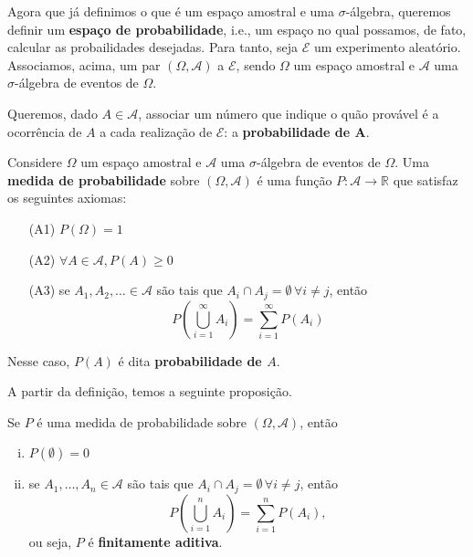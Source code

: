 \documentclass[../Notas.tex]{subfiles}
\begin{document}
Agora que já definimos o que é um espaço amostral e uma $\sigma$-álgebra, queremos definir um {\bf espaço de probabilidade}, i.e., um espaço no qual possamos, de fato, calcular as probailidades desejadas. Para tanto, seja $\mathcal{E}$ um experimento aleatório. Associamos, acima, um par $(\Omega, \mathcal{A})$ a $\mathcal{E}$, sendo $\Omega$ um espaço amostral e $\mathcal{A}$ uma $\sigma$-álgebra de eventos de $\Omega$.

Queremos, dado $A\in\mathcal{A}$, associar um número que indique o quão provável é a ocorrência de $A$ a cada realização de $\mathcal{E}$: a {\bf probabilidade de A}.

\begin{definition}
Considere $\Omega$ um espaço amostral e $\mathcal{A}$ uma $\sigma$-álgebra de eventos de $\Omega$. Uma {\bf medida de probabilidade} sobre $(\Omega, \mathcal{A})$ é uma função $P:\mathcal{A}\to\mathbb{R}$ que satisfaz os seguintes axiomas:
\begin{itemize}
    \item[(A1)] $P(\Omega) = 1$
    \item[(A2)] $\forall A\in\mathcal{A}, P(A)\geq 0$
    \item[(A3)] se $A_1, A_2, \dots \in\mathcal{A}$ são tais que $A_i\cap A_j = \emptyset \, \forall i\neq j$, então
    \begin{equation}
    \tag{$\sigma$-aditividade}
    P\left( \bigcup_{i=1}^{\infty} A_i \right) = \sum_{i=1}^{\infty} P(A_i) 
    \end{equation}
\end{itemize}
Nesse caso, $P(A)$ é dita {\bf probabilidade de $A$}. 
\end{definition}

A partir da definição, temos a seguinte proposição.

\begin{proposition}
Se $P$ é uma medida de probabilidade sobre $(\Omega, \mathcal{A})$, então
\begin{enumerate}[(i)]
    \item $P(\emptyset) = 0$
    \item se $A_1, \dots, A_n\in\mathcal{A}$ são tais que $A_i\cap A_j = \emptyset \, \forall i\neq j$, então
    $$
    P\left( \bigcup_{i=1}^{n} A_i \right) = \sum_{i=1}^{n} P(A_i),
    $$
    ou seja, $P$ é {\bf finitamente aditiva}.
\end{enumerate}
\end{proposition}
\end{document}
